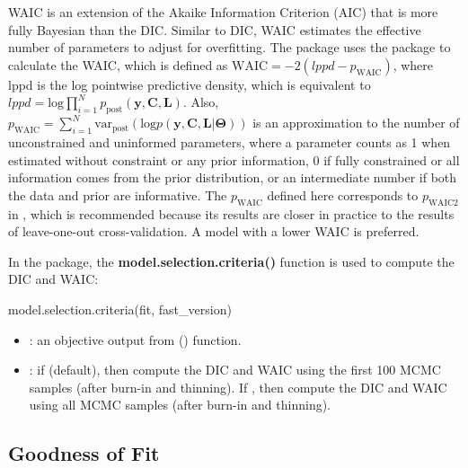 WAIC is an extension of the Akaike Information Criterion (AIC) that is more fully Bayesian than the DIC. Similar to DIC, WAIC estimates the effective number of parameters to adjust for overfitting. The  package uses the  package \citep{Hall2022} to calculate the WAIC, which is defined as $ \text{WAIC} = -2(lppd - p_{\text{WAIC}}) $, where lppd is the log pointwise predictive density, which is equivalent to $lppd=\text{log}\prod_{i=1}^Np_{\text{post}}(\boldsymbol{y},\boldsymbol{C},\boldsymbol{L})$. Also, $p_{\text{WAIC}} = \sum_{i=1}^N \text{var}_{\text{post}} (\text{log}p(\boldsymbol{y},\boldsymbol{C},\boldsymbol{L}|\boldsymbol{\Theta})) $ is an approximation to the number of unconstrained and uninformed parameters, where a parameter counts as 1 when estimated without constraint or any prior information, 0 if fully constrained or all information comes from the prior distribution, or an intermediate number if both the data and prior are informative. The $p_{\text{WAIC}}$ defined here corresponds to $p_{\text{WAIC2}}$ in \citet{Gelman2014a}, which is recommended because its results are closer in practice to the results of leave-one-out cross-validation. A model with a lower WAIC is preferred.

In the  package, the \textbf{model.selection.criteria()} function is used to compute the DIC and WAIC: 

\begin{example}

model.selection.criteria(fit, fast_version)

\end{example}

\begin{itemize}

	\item {}: an objective output from () function.  

	\item {}: if   (default), then compute the DIC and WAIC using the first 100 MCMC samples (after burn-in and thinning). If  , then compute the DIC and WAIC using all MCMC samples (after burn-in and thinning). 

\end{itemize}

\subsection{Goodness of Fit}

